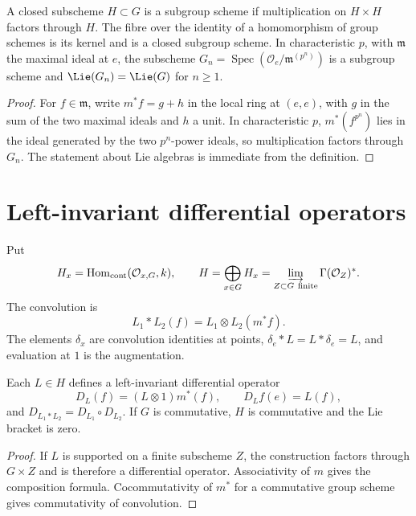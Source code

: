 \begin{definition}
\label{mumford-lem-group-scheme-kernel}
A closed subscheme $H\subset G$ is a subgroup scheme if multiplication on
$H\times H$ factors through $H$. The fibre over the identity of a homomorphism
of group schemes is its kernel and is a closed subgroup scheme.
In characteristic $p$, with $\mathfrak m$ the maximal ideal at $e$, the
subscheme $G_n=\operatorname{Spec}(\mathcal O_e/\mathfrak m^{(p^n)})$ is a
subgroup scheme and $\Lie(G_n)=\Lie(G)$ for $n\ge1$.
\end{definition}
\begin{proof}
For $f\in\mathfrak m$, write $m^*f=g+h$ in the local ring at $(e,e)$,
with $g$ in the sum of the two maximal ideals and $h$ a unit. In
characteristic $p$, $m^*(f^{p^n})$ lies in the ideal generated by the two
$p^n$-power ideals, so multiplication factors through $G_n$. The statement
about Lie algebras is immediate from the definition.
\end{proof}

\section{Left-invariant differential operators}
\label{mumford-III11-hyperalgebra}

\begin{definition}[Hyperalgebra]
\label{mumford-def-hyperalgebra}
Put
\[
H_x=\operatorname{Hom}_{\mathrm{cont}}(\mathcal O_{x,G},k),\qquad
H=\bigoplus_{x\in G}H_x
 =\varinjlim_{Z\subset G\ {\text{finite}}}\Gamma(\mathcal O_Z)^*.
\]
The convolution is
\[
L_1*L_2(f)=L_1\otimes L_2(m^*f).
\]
The elements $\delta_x$ are convolution identities at points,
$\delta_e*L=L*\delta_e=L$, and evaluation at $1$ is the augmentation.
\end{definition}

\begin{proposition}
\label{mumford-prop-hyperalgebra-operators}
Each $L\in H$ defines a left-invariant differential operator
\[
D_L(f)=(L\otimes1)m^*(f),\qquad D_Lf(e)=L(f),
\]
and $D_{L_1*L_2}=D_{L_1}\circ D_{L_2}$. If $G$ is commutative, $H$ is
commutative and the Lie bracket is zero.
\end{proposition}
\begin{proof}
If $L$ is supported on a finite subscheme $Z$, the construction factors
through $G\times Z$ and is therefore a differential operator. Associativity
of $m$ gives the composition formula. Cocommutativity of $m^*$ for a
commutative group scheme gives commutativity of convolution.
\end{proof}

